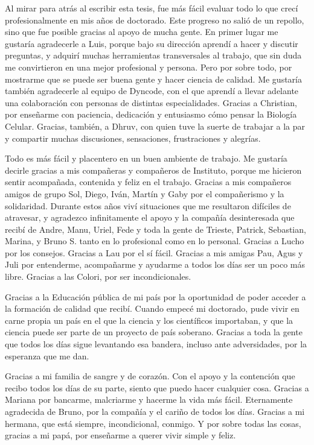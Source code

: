 \documentclass[./main.tex]{subfiles}
\begin{document}

Al mirar para atrás al escribir esta tesis, fue más fácil evaluar todo lo que crecí profesionalmente en mis años de doctorado. Este progreso no salió de un repollo, sino que fue posible gracias al apoyo de mucha gente. En primer lugar me gustaría agradecerle a Luis, porque bajo su dirección aprendí a hacer y discutir preguntas, y adquirí muchas herramientas transversales al trabajo, que sin duda me convirtieron en una mejor profesional y persona. Pero por sobre todo, por mostrarme que se puede ser buena gente y hacer ciencia de calidad. Me gustaría también agradecerle al equipo de Dyncode, con el que aprendí a llevar adelante una colaboración con personas de distintas especialidades. Gracias a Christian, por enseñarme con paciencia, dedicación y entusiasmo cómo pensar la Biología Celular. Gracias, también, a Dhruv, con quien tuve la suerte de trabajar a la par y compartir muchas discusiones, sensaciones, frustraciones y alegrías. 


Todo es más fácil y placentero en un buen ambiente de trabajo. Me gustaría decirle gracias a mis compañeras y compañeros de Instituto, porque me hicieron sentir acompañada, contenida y feliz en el trabajo. Gracias a mis compañeros amigos de grupo Sol, Diego, Iván, Martín y Gaby por el compañerismo y la solidaridad. Durante estos años viví situaciones que me resultaron difíciles de atravesar, y agradezco infinitamente el apoyo y la compañía desinteresada que recibí de Andre, Manu, Uriel, Fede y toda la gente de Trieste, Patrick, Sebastian, Marina, y Bruno S. tanto en lo profesional como en lo personal. Gracias a Lucho por los consejos. Gracias a Lau por el sí fácil. Gracias a mis amigas Pau, Agus y Juli por entenderme, acompañarme y ayudarme a todos los días ser un poco más libre. Gracias a las Colori, por ser incondicionales. 


Gracias a la Educación pública de mi país por la oportunidad de poder acceder a la formación de calidad que recibí. Cuando empecé mi doctorado, pude vivir en carne propia un país en el que la ciencia y los científicos importaban, y que la ciencia puede ser parte de un proyecto de país soberano. Gracias a toda la gente que todos los días sigue levantando esa bandera, incluso ante adversidades, por la esperanza que me dan. 

Gracias a mi familia de sangre y de corazón. Con el apoyo y la contención que recibo todos los días de su parte, siento que puedo hacer cualquier cosa. Gracias a Mariana por bancarme, malcriarme y hacerme la vida más fácil. Eternamente agradecida de Bruno, por la compañía y el cariño de todos los días. Gracias a mi hermana, que está siempre, incondicional, conmigo. Y por sobre todas las cosas, gracias a mi papá, por enseñarme a querer vivir simple y feliz. 
\end{document}

